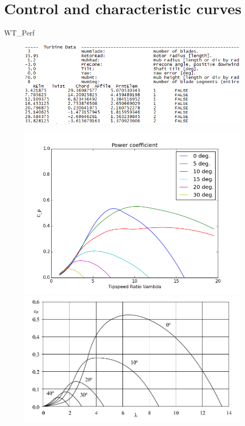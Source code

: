 \documentclass[12pt,t]{beamer}
\begin{document}
\section{Control and characteristic curves}
\begin{frame}
\Huge
WT\_Perf
\begin{figure}
\includegraphics[width=0.6\linewidth]{figures/wt_perf.png}
\end{figure}

\begin{figure}[htbp]
        \begin{minipage}{0.4\linewidth}
            \includegraphics[width=\linewidth]{figures/cp.png}
        \end{minipage}
        \begin{minipage}{0.4\linewidth}
\includegraphics[width=\linewidth]{figures/power_coeff_literature.png}
        \end{minipage}
\end{figure}
\end{frame}
\end{document}
